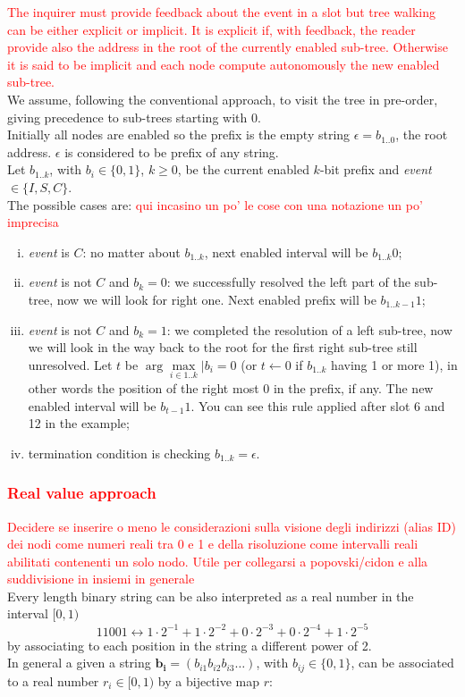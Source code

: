 \documentclass[12pt,a4paper]{report}
\begin{document}
\textcolor{red}{
The inquirer must provide feedback about the event in a slot but tree walking can be either explicit or implicit. It is explicit if, with feedback, the reader provide also the address in the root of the currently enabled sub-tree. Otherwise it is said to be implicit and each node compute autonomously the new enabled sub-tree.}\\
We assume, following the conventional approach, to visit the tree in pre-order, giving precedence to sub-trees starting with 0.\\
Initially all nodes are enabled so the prefix is the empty string $\epsilon=b_{1..0}$, the root address. $\epsilon$ is considered to be prefix of any string.\\
Let $b_{1..k}$, with $b_{i} \in \{0,1\}$, $k \geq0$, be the current enabled $k$-bit prefix and \emph{event} $\in \{I,S,C\}$.\\
The possible cases are: \textcolor{red}{qui incasino un po' le cose con una notazione un po' imprecisa}
\begin{enumerate}[i.]
\item \emph{event} is $C$: no matter about $b_{1..k}$, next enabled interval will be $b_{1..k}0$;
\item \emph{event} is not $C$ and $b_{k}=0$: we successfully resolved the left part of the sub-tree, now we will look for right one. Next enabled prefix will be $b_{1..k-1}1$;
\item \emph{event} is not $C$ and $b_{k}=1$: we completed the  resolution of a left sub-tree, now we will look in the way back to the root for the first right sub-tree still unresolved. Let $t$ be $ \arg\underset{i \in 1..k}{\max}|b_{i}=0$ (or $t\gets 0$ if $b_{1..k}$ having 1 or more 1), in other words the position of the right most 0 in the prefix, if any. The new enabled interval will be $b_{t-1}1$. You can see this rule applied after slot 6 and 12 in the example;
\item termination condition is checking $b_{1..k}=\epsilon$.
\end{enumerate}

\subsubsection{\textcolor{red}{Real value approach}}
\textcolor{red}{Decidere se inserire o meno le considerazioni sulla visione degli indirizzi (alias ID) dei nodi come numeri reali tra 0 e 1 e della risoluzione come intervalli reali abilitati contenenti un solo nodo. Utile per collegarsi a popovski/cidon e alla suddivisione in insiemi in generale}\\
Every length binary string can be also interpreted as a real number in the interval $[0,1)$
\begin{equation*}
11001 \leftrightarrow 1 \cdot 2^{-1} + 1 \cdot 2^{-2} + 0 \cdot 2^{-3} + 0 \cdot 2^{-4} +1 \cdot 2^{-5} 
\end{equation*}
by associating to each position in the string a different power of 2.\\
In general a given a string $\mathbf{b_{i}}=(b_{i1}b_{i2}b_{i3}\ldots)$, with $b_{ij} \in \{0,1\}$, can be associated to a real number $r_{i} \in [0,1)$ by a bijective map $r$:\\
\end{document}
